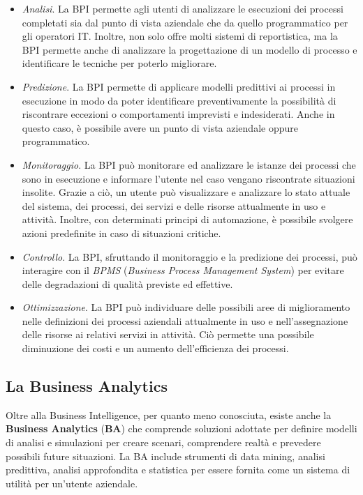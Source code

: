 \begin{itemize}
    \item \textit{Analisi}. La BPI permette agli utenti di analizzare le esecuzioni dei processi completati sia dal punto di vista aziendale che da quello programmatico per gli operatori IT. Inoltre, non solo offre molti sistemi di reportistica, ma la BPI permette anche di analizzare la progettazione di un modello di processo e identificare le tecniche per poterlo migliorare.
    \item \textit{Predizione}. La BPI permette di applicare modelli predittivi ai processi in esecuzione in modo da poter identificare preventivamente la possibilità di riscontrare eccezioni o comportamenti imprevisti e indesiderati. Anche in questo caso, è possibile avere un punto di vista aziendale oppure programmatico.
    \item \textit{Monitoraggio}. La BPI può monitorare ed analizzare le istanze dei processi che sono in esecuzione e informare l'utente nel caso vengano riscontrate situazioni insolite. Grazie a ciò, un utente può visualizzare e analizzare lo stato attuale del sistema, dei processi, dei servizi e delle risorse attualmente in uso e attività. Inoltre, con determinati principi di automazione, è possibile svolgere azioni predefinite in caso di situazioni critiche.
    \item \textit{Controllo}. La BPI, sfruttando il monitoraggio e la predizione dei processi, può interagire con il \textit{BPMS} (\textit{Business Process Management System}) per evitare delle degradazioni di qualità previste ed effettive.
    \item \textit{Ottimizzazione}. La BPI può individuare delle possibili aree di miglioramento nelle definizioni dei processi aziendali attualmente in uso e nell'assegnazione delle risorse ai relativi servizi in attività. Ciò permette una possibile diminuzione dei costi e un aumento dell'efficienza dei processi.
\end{itemize}

\subsection{La Business Analytics}

Oltre alla Business Intelligence, per quanto meno conosciuta, esiste anche la \textbf{Business Analytics} (\textbf{BA}) che comprende soluzioni adottate per definire modelli di analisi e simulazioni per creare scenari, comprendere realtà e prevedere possibili future situazioni. La BA include strumenti di data mining, analisi predittiva, analisi approfondita e statistica per essere fornita come un sistema di utilità per un'utente aziendale.\cite{gartner_ba}

